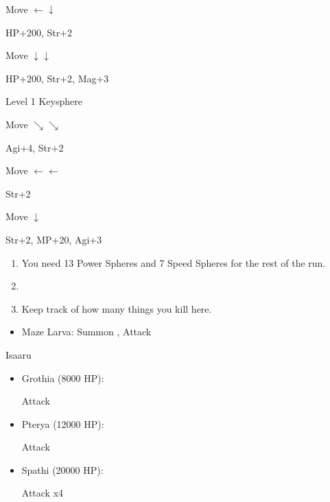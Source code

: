 \begin{spheregrid}
\begin{itemize}
\begin{itemize}
\begin{multicols}{2}
                \item Move $\leftarrow\downarrow$
                \item HP+200, Str+2
                \item Move $\downarrow\downarrow$
                \item HP+200, Str+2, Mag+3
                \item Level 1 Keysphere
                \item Move $\searrow\searrow$
                \item Agi+4, Str+2
                \item Move $\leftarrow\leftarrow$
                \item Str+2
                \item Move $\downarrow$
                \item Str+2, MP+20, Agi+3
            \end{multicols}
        \end{itemize}
    \end{itemize}
\end{spheregrid}
\begin{enumerate}[resume]
    \item You need 13 Power Spheres and 7 Speed Spheres for the rest of the run.
    \item \save
    \item Keep track of how many things you kill here.
\end{enumerate}
\begin{encounters}
    \begin{itemize}
        \item Maze Larva: Summon \ixion, Attack
    \end{itemize}
\end{encounters}
\begin{battle}{Isaaru}
    \begin{itemize}
        \item Grothia (8000 HP):
        \begin{itemize}
            \summon{\bahamut}
            \bahamutf Attack
        \end{itemize}
        \item Pterya (12000 HP):
        \begin{itemize}
            \summon{\bahamut}
            \bahamutf Attack
        \end{itemize}
        \item Spathi (20000 HP):
        \begin{itemize}
            \summon{\ixion}
            \ixionf Attack x4
        \end{itemize}
    \end{itemize}
\end{battle}
